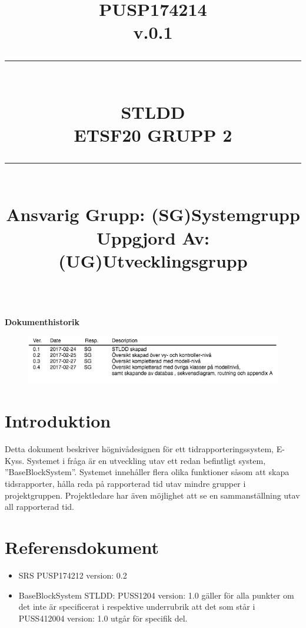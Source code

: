 \documentclass[paper=a4, fontsize=11pt,twoside]{article}
\title{
		\documentNumber{#1}																		
		\documentVersion{#2}																			
		\HRule{0.5pt} \\ %
		\LARGE \textbf{\uppercase{#3}} \\
		\large \textbf{\uppercase{ETSF20 Grupp 2}} 
		\HRule{2pt} \\ [1.5cm]    
		\normalsize            
		\documentResponsible{#4} \\ 
		\documentCreator{#5}  
	}
\newcommand{\HRule}[1]{\rule{\linewidth}{#1}}
\newcommand{\documentNumber}[1]{\centering PUSP1742#1 \\[1.0cm]}
\newcommand{\documentVersion}[1]{\centering \small{v.#1} \\[1.0cm]}
\newcommand{\documentResponsible}[1]{\centering  Ansvarig Grupp: #1}
\newcommand{\documentCreator}[1]{\centering Uppgjord Av: #1}
\newcommand{\grouptitlepage}[5]{ 
	\title{
		\documentNumber{#1}																		
		\documentVersion{#2}																			
		\HRule{0.5pt} \\ %
		\LARGE \textbf{\uppercase{#3}} \\
		\large \textbf{\uppercase{ETSF20 Grupp 2}} 
		\HRule{2pt} \\ [1.5cm]    
		\normalsize            
		\documentResponsible{#4} \\ 
		\documentCreator{#5}  
	}																							
	\maketitle																					
	\thispagestyle{empty} 																		
	\newpage 
}
\begin{document}
\grouptitlepage
{14}
{0.1}
{STLDD}
{(SG)Systemgrupp}
{(UG)Utvecklingsgrupp}
\tableofcontents
\mbox{}\\
{\Large \textbf{Dokumenthistorik}}
\begin{figure}[H]

\includegraphics[width=13cm]{DokumentHistorik}
\end{figure}
\section{Introduktion}
Detta dokument beskriver högnivådesignen för ett tidrapporteringssystem, E-Kyss. Systemet i fråga är en utveckling utav ett redan befintligt system, ''BaseBlockSystem''. Systemet innehåller flera olika funktioner såsom att skapa tidsrapporter, hålla reda på rapporterad tid utav mindre grupper i projektgruppen. Projektledare har även möjlighet att se en sammanställning utav all rapporterad tid. 

\section{Referensdokument}
\begin{itemize}
\item SRS PUSP174212 version: 0.2
\item BaseBlockSystem STLDD: PUSS1204 version: 1.0 gäller för alla punkter om det inte är specificerat i respektive underrubrik att det som står i PUSS412004 version: 1.0 utgår för specifik del.
\end{itemize}
\end{document}
